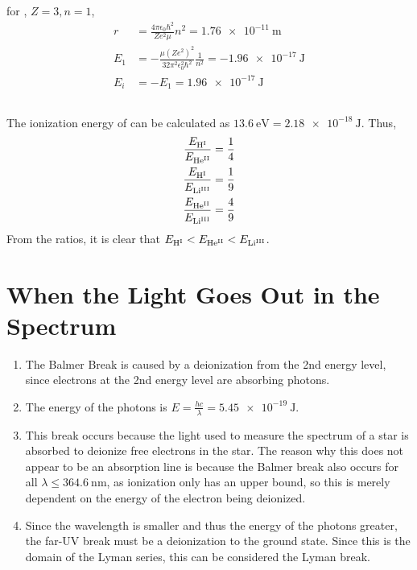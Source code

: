 \documentclass{article}
\begin{document}
\subsection{}

for , \(Z = 3, n = 1\),
\begin{align}
    r &= \frac{4 \pi \epsilon_0 \hbar^2}{Z e^2 \mu} n^2 = \SI{1.76e-11}{\meter} \\
    E_1 &= -\frac{\mu (Z e^2)^2}{32 \pi^2 \epsilon_0^2 \hbar^2} \frac{1}{n^2} = \SI{-1.96e-17}{\joule} \\
    E_i &= -E_1 = \SI{1.96e-17}{\joule}
\end{align}

\subsection{}

The ionization energy of  can be calculated as \(\SI{13.6}{\electronvolt} = \SI{2.18e-18}{\joule}\).
Thus,
\begin{align}
    \frac{E_{\ce{H^I}}}{E_{\ce{He^{II}}}} &= \frac{1}{4} \\
    \frac{E_{\ce{H^I}}}{E_{\ce{Li^{III}}}} &= \frac{1}{9} \\
    \frac{E_{\ce{He^{II}}}}{E_{\ce{Li^{III}}}} &= \frac{4}{9}
\end{align}
From the ratios, it is clear that \(E_{\ce{H^I}} < E_{\ce{He^{II}}} < E_{\ce{Li^{III}}}\).

\section{When the Light Goes Out in the Spectrum}

\begin{enumerate}
    \item The Balmer Break is caused by a deionization from the 2nd energy level, since electrons at the 2nd energy level are absorbing photons.
    \item The energy of the photons is \(E = \frac{h c}{\lambda} = \SI{5.45e-19}{\joule}\).
    \item This break occurs because the light used to measure the spectrum of a star is absorbed to deionize free electrons in the star.
    The reason why this does not appear to be an absorption line is because the Balmer break also occurs for all \(\lambda \leqslant \SI{364.6}{\nano\meter}\), as ionization only has an upper bound, so this is merely dependent on the energy of the electron being deionized.
    \item Since the wavelength is smaller and thus the energy of the photons greater, the far-UV break must be a deionization to the ground state.
    Since this is the domain of the Lyman series, this can be considered the Lyman break.
\end{enumerate}
\end{document}
